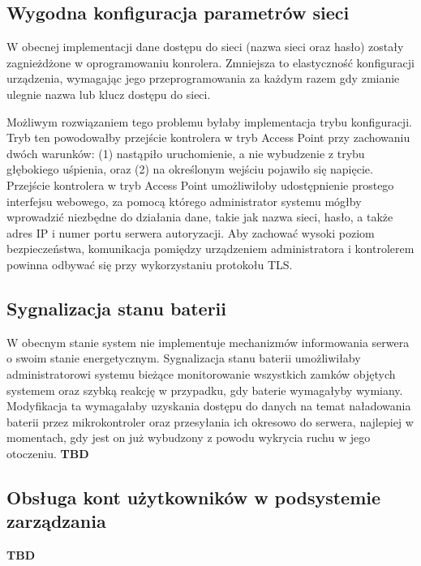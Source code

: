         \subsection{Wygodna konfiguracja parametrów sieci}
            W obecnej implementacji dane dostępu do sieci (nazwa sieci oraz hasło) zostały zagnieżdżone w oprogramowaniu konrolera. Zmniejsza to elastyczność konfiguracji urządzenia, wymagając jego przeprogramowania za każdym razem gdy zmianie ulegnie nazwa lub klucz dostępu do sieci.

            Możliwym rozwiązaniem tego problemu byłaby implementacja trybu konfiguracji. Tryb ten powodowałby przejście kontrolera w tryb Access Point przy zachowaniu dwóch warunków: (1) nastąpiło uruchomienie, a nie wybudzenie z trybu głębokiego uśpienia, oraz (2) na określonym wejściu pojawiło się napięcie. Przejście kontrolera w tryb Access Point umożliwiłoby udostępnienie prostego interfejsu webowego, za pomocą którego administrator systemu mógłby wprowadzić niezbędne do działania dane, takie jak nazwa sieci, hasło, a także adres IP i numer portu serwera autoryzacji. Aby zachować wysoki poziom bezpieczeństwa, komunikacja pomiędzy urządzeniem administratora i kontrolerem powinna odbywać się przy wykorzystaniu protokołu TLS.

        \subsection{Sygnalizacja stanu baterii}
            W obecnym stanie system nie implementuje mechanizmów informowania serwera o swoim stanie energetycznym.
            Sygnalizacja stanu baterii umożliwiłaby administratorowi systemu bieżące monitorowanie wszystkich zamków objętych systemem oraz szybką reakcję w przypadku, gdy baterie wymagałyby wymiany. Modyfikacja ta wymagałaby uzyskania dostępu do danych na temat naładowania baterii przez mikrokontroler oraz przesyłania ich okresowo do serwera, najlepiej w momentach, gdy jest on już wybudzony z powodu wykrycia ruchu w jego otoczeniu.
            \textbf{TBD}

        \subsection{Obsługa kont użytkowników w podsystemie zarządzania}
            \textbf{TBD}
